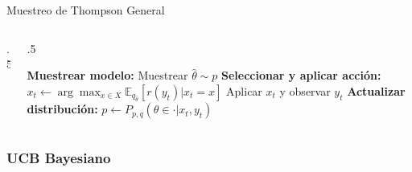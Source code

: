 \documentclass[10pt, envcountsect, handout, aspectratio=1610, hyperref={hypertexnames=true}]{beamer}
\begin{document}
\begin{frame}{Muestreo de Thompson General}
{\begin{minipage}{1.1\textwidth}
\begin{columns}
\begin{column}{.5\textwidth}
\end{column}

\begin{column}{.5\textwidth}
\begin{algorithm}[H]
\caption{Thompson($X, p, q, r$)}
\begin{algorithmic}[1]
    \STATE \textbf{Muestrear modelo:} Muestrear $\hat{\theta} \sim p$
    \STATE \textbf{Seleccionar y aplicar acción:}
    \STATE $x_t \leftarrow \arg\max_{x \in X} \mathbb{E}_{q_{\hat{\theta}}}[r(y_t) | x_t = x]$
    \STATE Aplicar $x_t$ y observar $y_t$
    \STATE \textbf{Actualizar distribución:} $p \leftarrow P_{p,q}(\theta \in \cdot | x_t, y_t)$
\ENDFOR
\end{algorithmic}
\end{algorithm}
\end{column}
\end{columns}
\end{minipage}}

\end{frame}




\subsubsection{UCB Bayesiano}
\end{document}
